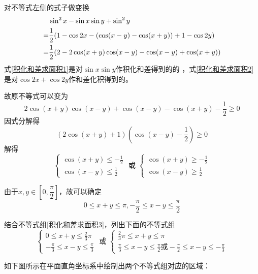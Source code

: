\begin{jie}
\begin{way1}
    对不等式左侧的式子做变换
\begin{align}
     &\sin ^2 x-\sin x \sin y+\sin ^2y \notag\\ 
     =&\frac{1}{2}(1-\cos 2x-(\cos(x-y)-\cos(x+y))+1-\cos2y)\label{积化和差求面积1}\\
     =&\frac{1}{2}(2-2\cos(x+y)\cos(x-y)-\cos(x-y)+\cos(x+y))\label{积化和差求面积2}
\end{align}
   式\ref{积化和差求面积1}是对\(\sin x\sin y\)作积化和差得到的的
   ，式\ref{积化和差求面积2}是对\(\cos 2x+\cos 2y\)作和差化积得到的。
   
   故原不等式可以变为
   \[2\cos(x+y)\cos(x-y)+\cos(x-y)-\cos(x+y)-\frac{1}{2}\geq 0\]
   因式分解得
   \[(2\cos(x+y)+1)(\cos(x-y)-\frac{1}{2})\geq 0\]
   解得
 \begin{equation}\label{积化和差求面积3}
      \left\{\begin{array} { l } 
       \displaystyle{ \cos(x + y) \leqslant -\frac { 1 } { 2 }  } \\
       \displaystyle{ \cos(x - y) \leqslant \frac{1}{2}}
       \end{array} \text { 或 } \left\{\begin{array}{l}
       \displaystyle\cos(x + y) \geqslant -\frac { 1 } { 2 } \\
       \displaystyle\cos(x - y) \geqslant \frac{1}{2}
       \end{array}\right.\right.
 \end{equation}

    由于\(x,y\in[0,\dfrac{\pi }{2}]\)，故可以确定
    \[0\leq x+y\leq\pi,-\frac{\pi}{2}\leq x-y\leq \frac{\pi}{2}\]

    结合不等式组\ref{积化和差求面积3}，列出下面的不等式组
   \[\left\{\begin{array} { l } 
    \displaystyle{0 \leq x + y \leqslant \frac { 2 } { 3 }\pi  } \\
    \displaystyle{-\frac{\pi}{3} \leq x - y \leq \frac { \pi } { 3 } }
    \end{array} \text { 或 } \left\{\begin{array}{l}
    \displaystyle \frac{2 }{3}\pi\leq x+y \leq \pi \\
    \displaystyle\frac{\pi}{3}\leq x-y  \leq \frac{\pi}{2} \text{或}-\frac{\pi}{2}\leq x-y  \leq -\frac{\pi}{3}
    \end{array}\right.\right.\]

    如下图所示在平面直角坐标系中绘制出两个不等式组对应的区域：


\end{way1}
\end{jie}
